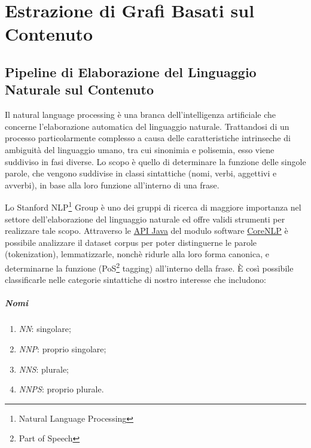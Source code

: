 \chapter{Estrazione di Grafi Basati sul Contenuto}

\section{Pipeline di Elaborazione del Linguaggio Naturale sul Contenuto}

Il natural language processing {\`e} una branca dell'intelligenza artificiale che concerne l'elaborazione automatica del linguaggio naturale. Trattandosi di un processo particolarmente complesso a causa delle caratteristiche intrinseche di ambiguit{\`a} del linguaggio umano, tra cui sinonimia e polisemia, esso viene suddiviso in fasi diverse. Lo scopo {\`e} quello di determinare la funzione delle singole parole, che vengono suddivise in classi sintattiche (nomi, verbi, aggettivi e avverbi), in base alla loro funzione all'interno di una frase.

Lo Stanford NLP\footnote{Natural Language Processing} Group {\`e} uno dei gruppi di ricerca di maggiore importanza nel settore dell'elaborazione del linguaggio naturale ed offre validi strumenti per realizzare tale scopo. Attraverso le \href{https://github.com/stanfordnlp/CoreNLP}{API Java} del modulo software \href{https://stanfordnlp.github.io/CoreNLP/}{CoreNLP} {\`e} possibile analizzare il dataset corpus per poter distinguerne le parole (tokenization), lemmatizzarle, nonch{\`e} ridurle alla loro forma canonica, e determinarne la funzione (PoS\footnote{Part of Speech} tagging) all'interno della frase. {\`E} cos{\`i} possibile classificarle nelle categorie sintattiche di nostro interesse che includono:

\paragraph{Nomi}

\begin{enumerate}[label=(\roman*)]
  
\item \textit{NN}: singolare;
\item \textit{NNP}: proprio singolare;
\item \textit{NNS}: plurale;
\item \textit{NNPS}: proprio plurale.

\end{enumerate}

